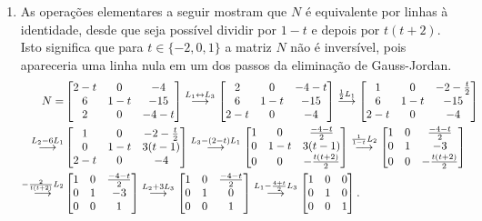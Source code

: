 \documentclass[12pt,a4paper]{article}
\newcommand{\grstep}[2][\relax]{%
   \ensuremath{\mathrel{
       {\mathop{\longrightarrow}\limits^{#2\mathstrut}_{
                                     \begin{subarray}{l} #1 \end{subarray}}}}}}
\newcommand{\swap}{\leftrightarrow}
\begin{document}
\begin{enumerate}
\item As operações elementares a seguir mostram que $N$ é equivalente por linhas à identidade, desde que seja possível dividir por $1-t$ e depois por $t(t+2)$. Isto significa que para $t \in\{ -2, 0, 1 \}$ a matriz $N$ não é inversível, pois apareceria uma linha nula em um dos passos da eliminação de Gauss-Jordan.
\begin{align*}
N= & \begin{bmatrix}
2-t & 0 & -4 \\
6 & 1-t & -15 \\
2 & 0 & -4-t
\end{bmatrix}
\grstep{ L_1 \swap L_3 }
\begin{bmatrix}
2 & 0 & -4-t \\
6 & 1-t & -15 \\
2-t & 0 & -4
\end{bmatrix}
\grstep{ \frac{1}{2} L_1 }
\begin{bmatrix}
1 & 0 & -2-\frac{t}{2} \\
6 & 1-t & -15 \\
2-t & 0 & -4
\end{bmatrix} \\
\grstep{ L_2 - 6 L_1 }
& \begin{bmatrix}
1 & 0 & -2-\frac{t}{2} \\
0 & 1-t & 3(t-1) \\
2-t & 0 & -4
\end{bmatrix}
\grstep{ L_3 - (2-t) L_1 }
\begin{bmatrix}
1 & 0 & \frac{-4-t}{2} \\
0 & 1-t & 3(t-1) \\
0 & 0 & -\frac{t(t+2)}{2}
\end{bmatrix}
\grstep{ \frac{1}{1-t} L_2 }
\begin{bmatrix}
1 & 0 & \frac{-4-t}{2} \\
0 & 1 & -3 \\
0 & 0 & -\frac{t(t+2)}{2}
\end{bmatrix}\\
\grstep{ -\frac{2}{t(t+2)} L_2 }
& \begin{bmatrix}
1 & 0 & \frac{-4-t}{2} \\
0 & 1 & -3 \\
0 & 0 & 1
\end{bmatrix}
\grstep{ L_2 + 3 L_3}
\begin{bmatrix}
1 & 0 & \frac{-4-t}{2} \\
0 & 1 & 0 \\
0 & 0 & 1
\end{bmatrix}
\grstep{ L_1 -\frac{4+t}{2} L_3}
\begin{bmatrix}
1 & 0 & 0 \\
0 & 1 & 0 \\
0 & 0 & 1
\end{bmatrix}.
\end{align*}


\end{enumerate}
\end{document}
